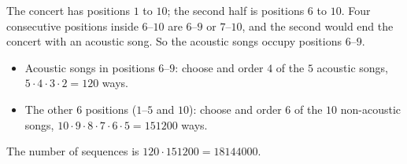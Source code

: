 The concert has positions $1$ to $10$; the second half is positions $6$ to $10$. Four consecutive positions inside $6$--$10$ are $6$--$9$ or $7$--$10$, and the second would end the concert with an acoustic song. So the acoustic songs occupy positions $6$--$9$.
\begin{itemize}
\item Acoustic songs in positions $6$--$9$: choose and order $4$ of the $5$ acoustic songs, $5\cdot4\cdot3\cdot2=120$ ways.
\item The other $6$ positions ($1$--$5$ and $10$): choose and order $6$ of the $10$ non-acoustic songs, $10\cdot9\cdot8\cdot7\cdot6\cdot5=151200$ ways.
\end{itemize}
The number of sequences is $120\cdot151200=\boxed{18144000}$.
